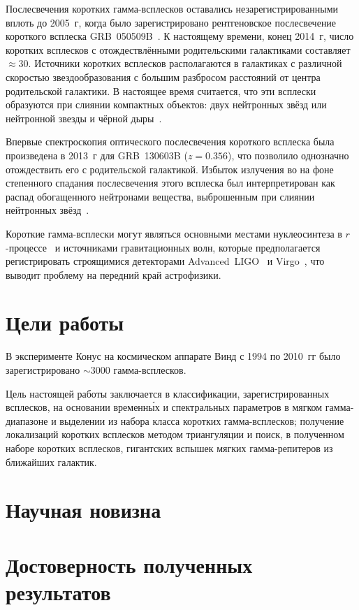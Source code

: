 Послесвечения коротких гамма-всплесков оставались незарегистрированными вплоть 
до 2005~г, когда было зарегистрировано рентгеновское послесвечение короткого 
всплеска GRB~050509B~\citep{Gehrels_2005Natur}. К настоящему времени, конец 2014~г, 
число коротких всплесков с отождествлёнными родительскими галактиками составляет $\approx 30$. 
Источники коротких всплесков располагаются в галактиках с различной скоростью 
звездообразования с большим разбросом расстояний от центра родительской галактики. 
В настоящее время считается, что эти всплески образуются при слиянии компактных 
объектов: двух нейтронных звёзд или нейтронной звезды и чёрной дыры~\citep{}.

Впервые спектроскопия оптического послесвечения короткого всплеска была произведена в 2013~г 
для GRB~130603B ($z = 0.356$), что позволило однозначно отождествить его с 
родительской галактикой. Избыток излучения во на фоне степенного спадания 
послесвечения этого всплеска был интерпретирован как распад обогащенного 
нейтронами вещества, выброшенным при слиянии нейтронных звёзд~\citep{Tanvir_2013Natur}. 

Короткие гамма-всплески могут являться основными местами нуклеосинтеза в 
$r$-процессе~\citep{Tanvir_2013Natur} и источниками гравитационных волн, 
которые предполагается регистрировать строящимися детекторами Advanced~LIGO~\citep{Harry_2010CQGra} 
и Virgo~\citep{Accadia_2012JInst}, что выводит проблему на передний край астрофизики.

\section{Цели работы}
В эксперименте Конус на космическом аппарате Винд с 1994 по 2010~гг было 
зарегистрировано $\sim 3000$ гамма-всплесков. 

Цель настоящей работы заключается в классификации, зарегистрированных всплесков, 
на основании временн\'{ы}х и спектральных параметров в мягком гамма-диапазоне 
и выделении из набора класса коротких гамма-всплесков; получение локализаций 
коротких всплесков методом триангуляции и поиск, в полученном наборе коротких всплесков, гигантских 
вспышек мягких гамма-репитеров из ближайших галактик.

\section{Научная новизна}


\section{Достоверность полученных результатов}



